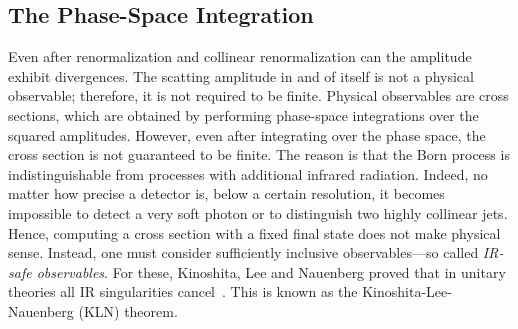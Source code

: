 \subsection{The Phase-Space Integration}\label{subsec:phase_space_integration}
Even after renormalization and collinear renormalization can the amplitude exhibit divergences. The scatting amplitude in and of itself is not a physical observable; therefore, it is not required to be finite. Physical observables are cross sections, which are obtained by performing phase-space integrations over the squared amplitudes. However, even after integrating over the phase space, the cross section is not guaranteed to be finite. The reason is that the Born process is indistinguishable from processes with additional infrared radiation. Indeed, no matter how precise a detector is, below a certain resolution, it becomes impossible to detect a very soft photon or to distinguish two highly collinear jets. Hence, computing a cross section with a fixed final state does not make physical sense. Instead, one must consider sufficiently inclusive observables---so called \textit{IR-safe observables}. For these, Kinoshita, Lee and Nauenberg proved that in unitary theories all IR singularities cancel~\cite{Kinoshita:1975bt, Lee:1964is}. This is known as the Kinoshita-Lee-Nauenberg (KLN) theorem.

